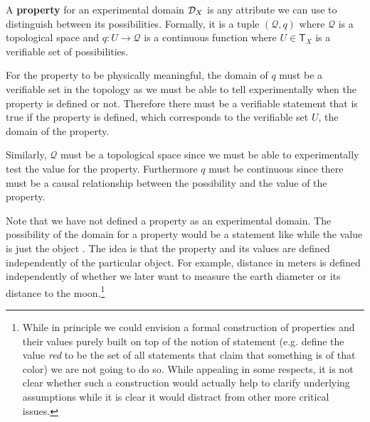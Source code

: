 \documentclass[11pt,letterpaper,fleqn]{memoir} %
\begin{document}
\begin{mathSection}
	\begin{defn}
		A \textbf{property} for an experimental domain $\mathcal{D}_X$ is any attribute we can use to distinguish between its possibilities. Formally, it is a tuple $(\mathcal{Q}, q)$ where $\mathcal{Q}$ is a topological space and $q : U \to \mathcal{Q}$ is a continuous function where $U \in \mathsf{T}_X$ is a verifiable set of possibilities.
	\end{defn}
	\begin{justification}
		For the property to be physically meaningful, the domain of $q$ must be a verifiable set in the topology as we must be able to tell experimentally when the property is defined or not. Therefore there must be a verifiable statement that is true if the property is defined, which corresponds to the verifiable set $U$, the domain of the property.
		
		Similarly, $\mathcal{Q}$ must be a topological space since we must be able to experimentally test the value for the property. Furthermore $q$ must be continuous since there must be a causal relationship between the possibility and the value of the property.

	\end{justification}
\end{mathSection}
		
Note that we have not defined a property as an experimental domain. The possibility of the domain for a property would be a statement like  while the value is just the object . The idea is that the property and its values are defined independently of the particular object. For example, distance in meters is defined independently of whether we later want to measure the earth diameter or its distance to the moon.\footnote{While in principle we could envision a formal construction of properties and their values purely built on top of the notion of statement (e.g. define the value \emph{red} to be the set of all statements that claim that something is of that color) we are not going to do so. While appealing in some respects, it is not clear whether such a construction would actually help to clarify underlying assumptions while it is clear it would distract from other more critical issues.}
\end{document}
